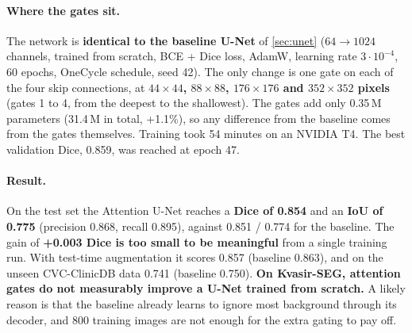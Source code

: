 \paragraph{Where the gates sit.}
The network is \textbf{identical to the baseline U-Net} of \cref{sec:unet} ($64 \rightarrow 1024$ channels, trained from scratch,
BCE + Dice loss, AdamW, learning rate $3\cdot10^{-4}$, 60 epochs, OneCycle schedule, seed 42). The only change is
one gate on each of the four skip connections, at \textbf{$44\times44$, $88\times88$, $176\times176$ and $352\times352$ pixels} (gates 1 to 4,
from the deepest to the shallowest). The gates add only 0.35\,M parameters (31.4\,M in total, +1.1\%), so any
difference from the baseline comes from the gates themselves.
Training took 54 minutes on an NVIDIA T4. The best validation Dice, 0.859, was reached at epoch 47.

\paragraph{Result.}
On the test set the Attention U-Net reaches a \textbf{Dice of 0.854} and an \textbf{IoU of 0.775}
(precision 0.868, recall 0.895), against 0.851 / 0.774 for the baseline. The gain of \textbf{+0.003 Dice is
too small to be meaningful} from a single training run. With test-time augmentation it scores 0.857 (baseline 0.863), and on the unseen
CVC-ClinicDB data 0.741 (baseline 0.750). \textbf{On Kvasir-SEG, attention gates do not measurably improve a U-Net
trained from scratch.} A likely reason is that the baseline already learns to ignore most background through
its decoder, and 800 training images are not enough for the extra gating to pay off.


